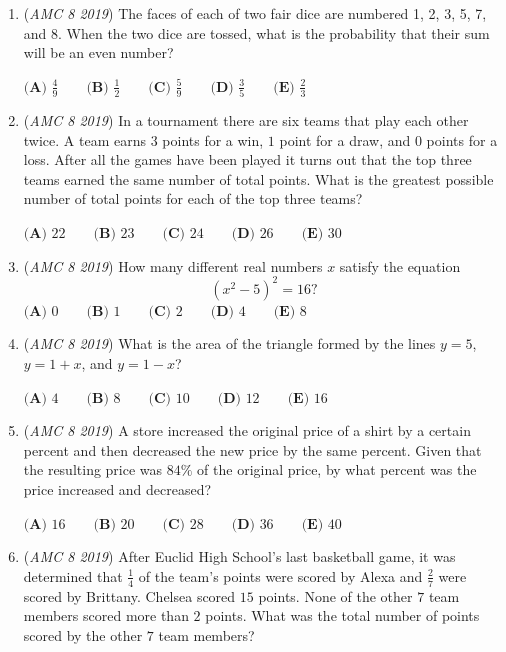 \begin{enumerate}
	\item (\textit{AMC 8 2019}) The faces of each of two fair dice are numbered 1, 2, 3, 5, 7, and 8. When the two dice are tossed, what is the probability that their sum will be an even number?


 $\textbf{(A) }\frac{4}{9}\qquad\textbf{(B) }\frac{1}{2}\qquad\textbf{(C) }\frac{5}{9}\qquad\textbf{(D) }\frac{3}{5}\qquad\textbf{(E) }\frac{2}{3}$


	\item (\textit{AMC 8 2019}) In a tournament there are six teams that play each other twice. A team earns $3$ points for a win, $1$ point for a draw, and $0$ points for a loss. After all the games have been played it turns out that the top three teams earned the same number of total points. What is the greatest possible number of total points for each of the top three teams?


 $\textbf{(A) }22\qquad\textbf{(B) }23\qquad\textbf{(C) }24\qquad\textbf{(D) }26\qquad\textbf{(E) }30$


	\item (\textit{AMC 8 2019}) How many different real numbers $x$ satisfy the equation 
 \[(x^{2}-5)^{2}=16?\]
$\textbf{(A) }0\qquad\textbf{(B) }1\qquad\textbf{(C) }2\qquad\textbf{(D) }4\qquad\textbf{(E) }8$


	\item (\textit{AMC 8 2019}) What is the area of the triangle formed by the lines $y=5$, $y=1+x$, and $y=1-x$?


 $\textbf{(A) }4\qquad\textbf{(B) }8\qquad\textbf{(C) }10\qquad\textbf{(D) }12\qquad\textbf{(E) }16$


	\item (\textit{AMC 8 2019}) A store increased the original price of a shirt by a certain percent and then decreased the new price by the same percent. Given that the resulting price was $84\%$ of the original price, by what percent was the price increased and decreased?


 $\textbf{(A) }16\qquad\textbf{(B) }20\qquad\textbf{(C) }28\qquad\textbf{(D) }36\qquad\textbf{(E) }40$


	\item (\textit{AMC 8 2019}) After Euclid High School's last basketball game, it was determined that $\frac{1}{4}$ of the team's points were scored by Alexa and $\frac{2}{7}$ were scored by Brittany. Chelsea scored $15$ points. None of the other $7$ team members scored more than $2$ points. What was the total number of points scored by the other $7$ team members?



\end{enumerate}
